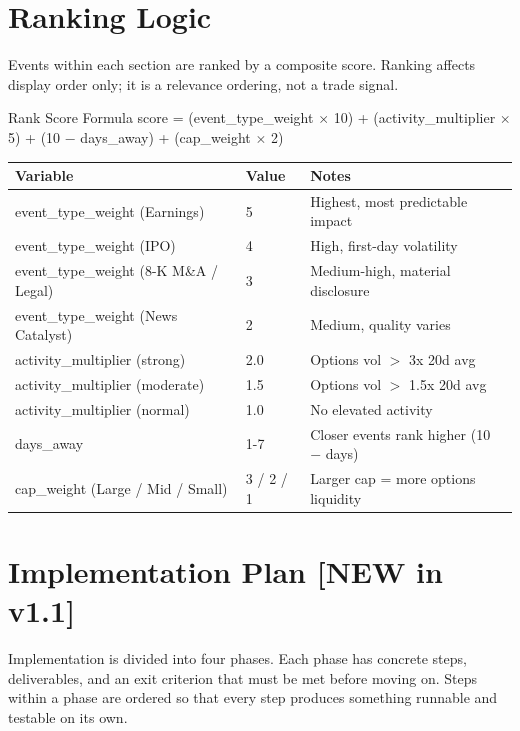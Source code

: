 \documentclass[11pt]{article}
\begin{document}
\section{Ranking Logic}

Events within each section are ranked by a composite score. Ranking affects display order only; it is a relevance ordering, not a trade signal.

\begin{callout}{Rank Score Formula}
score = (event\_type\_weight $\times$ 10) + (activity\_multiplier $\times$ 5) + (10 $-$ days\_away) + (cap\_weight $\times$ 2)
\end{callout}

\begin{tabularx}{\textwidth}{|X|L{1.6cm}|L{6.2cm}|}
\hline
\textbf{Variable} & \textbf{Value} & \textbf{Notes} \\
\hline
event\_type\_weight (Earnings) & 5 & Highest, most predictable impact \\
\hline
event\_type\_weight (IPO) & 4 & High, first-day volatility \\
\hline
event\_type\_weight (8-K M\&A / Legal) & 3 & Medium-high, material disclosure \\
\hline
event\_type\_weight (News Catalyst) & 2 & Medium, quality varies \\
\hline
activity\_multiplier (strong) & 2.0 & Options vol $>$ 3x 20d avg \\
\hline
activity\_multiplier (moderate) & 1.5 & Options vol $>$ 1.5x 20d avg \\
\hline
activity\_multiplier (normal) & 1.0 & No elevated activity \\
\hline
days\_away & 1-7 & Closer events rank higher (10 $-$ days) \\
\hline
cap\_weight (Large / Mid / Small) & 3 / 2 / 1 & Larger cap = more options liquidity \\
\hline
\end{tabularx}

\section{Implementation Plan \hfill {\small [NEW in v1.1]}}\label{sec:impl}

Implementation is divided into four phases. Each phase has concrete steps, deliverables, and an exit criterion that must be met before moving on. Steps within a phase are ordered so that every step produces something runnable and testable on its own.
\end{document}
